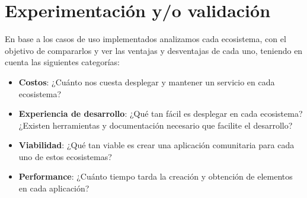 \section{Experimentación y/o validación}

En base a los casos de uso implementados analizamos cada ecosistema, con el objetivo de compararlos y ver las ventajas y desventajas de cada uno, teniendo en cuenta las siguientes categorías:

\begin{itemize}
    \item \textbf{Costos}: ¿Cuánto nos cuesta desplegar y mantener un servicio en cada ecosistema?
    \item \textbf{Experiencia de desarrollo}: ¿Qué tan fácil es desplegar en cada ecosistema? ¿Existen herramientas y documentación necesario que facilite el desarrollo?
    \item \textbf{Viabilidad}: ¿Qué tan viable es crear una aplicación comunitaria para cada uno de estos ecosistemas?
    \item \textbf{Performance}: ¿Cuánto tiempo tarda la creación y obtención de elementos en cada aplicación?
\end{itemize}



